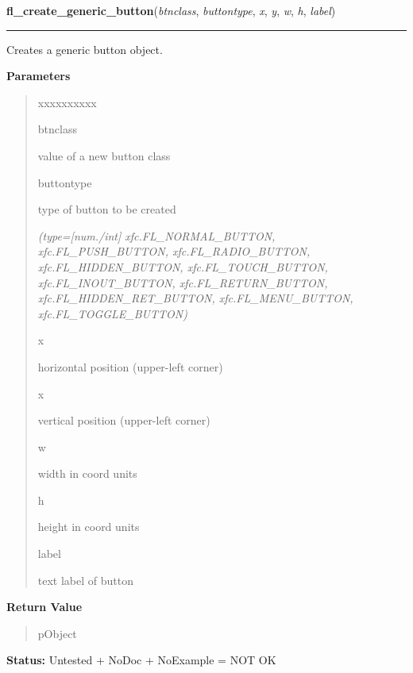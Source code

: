 \hspace{.8\funcindent}\begin{boxedminipage}{\funcwidth}

    \raggedright \textbf{fl\_create\_generic\_button}(\textit{btnclass}, \textit{buttontype}, \textit{x}, \textit{y}, \textit{w}, \textit{h}, \textit{label})

    \vspace{-1.5ex}

    \rule{\textwidth}{0.5\fboxrule}
\setlength{\parskip}{2ex}
    Creates a generic button object.

\setlength{\parskip}{1ex}
      \textbf{Parameters}
      \vspace{-1ex}

      \begin{quote}
        \begin{Ventry}{xxxxxxxxxx}

          \item[btnclass]

          value of a new button class

          \item[buttontype]

          type of button to be created

            {\it (type=[num./int] xfc.FL\_NORMAL\_BUTTON, xfc.FL\_PUSH\_BUTTON, 
xfc.FL\_RADIO\_BUTTON, xfc.FL\_HIDDEN\_BUTTON, xfc.FL\_TOUCH\_BUTTON, 
xfc.FL\_INOUT\_BUTTON, xfc.FL\_RETURN\_BUTTON, xfc.FL\_HIDDEN\_RET\_BUTTON,
xfc.FL\_MENU\_BUTTON, xfc.FL\_TOGGLE\_BUTTON)}

          \item[x]

          horizontal position (upper-left corner)

          \item[x]

          vertical position (upper-left corner)

          \item[w]

          width in coord units

          \item[h]

          height in coord units

          \item[label]

          text label of button

        \end{Ventry}

      \end{quote}

      \textbf{Return Value}
    \vspace{-1ex}

      \begin{quote}
      pObject

      \end{quote}

\textbf{Status:} Untested + NoDoc + NoExample = NOT OK



    \end{boxedminipage}

